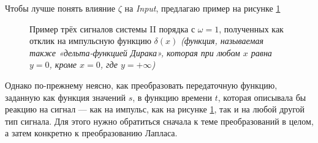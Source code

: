 \documentclass[a4paper, 10pt, final]{article} %
\newcommand{\parenciteit}[2]{\textit{\parencite[#1]{#2}}} %
\begin{document}
    \begin{samepage}
        \noindent Чтобы лучше понять влияние $\zeta$ на \emph{Input}, предлагаю пример на рисунке \ref{fig:ExampleDampingAndFrequencyDifference}
        \begin{figure}[H]
            \centering
            \caption{Пример трёх сигналов системы II порядка с $\omega=1$, полученных как отклик на импульсную функцию $\delta(x)$ \emph{(функция, называемая также «дельта-функцией Дирака», которая при любом $x$ равна $y = 0$, кроме $x = 0$, где $y = +\infty$)} \parenciteit{}{Impulse:Wiki}}
            \label{fig:ExampleDampingAndFrequencyDifference}
        \end{figure}
    \end{samepage}

    Однако по-прежнему неясно, как преобразовать передаточную функцию, заданную как функция значений $s$, в функцию времени $t$, которая описывала бы реакцию на сигнал --- как на импульс, как на рисунке \ref{fig:ExampleDampingAndFrequencyDifference}, так и на любой другой тип сигнала.
    Для этого нужно обратиться сначала к теме преобразований в целом, а затем конкретно к преобразованию Лапласа.
\end{document}
